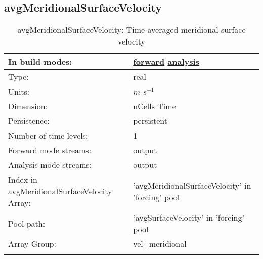 \subsection[avgMeridionalSurfaceVelocity]{avgMeridionalSurfaceVelocity}
\label{subsec:var_sec_forcing_avgMeridionalSurfaceVelocity}
\begin{center}
\begin{longtable}{| p{2.0in} | p{4.0in} |}
        \hline 
        In build modes: & \hyperref[subsec:forward_var_tab_forcing]{forward} \hyperref[subsec:analysis_var_tab_forcing]{analysis} \\
        \hline 
        Type: & real \\
        \hline 
        Units: & $m$ $s^{-1}$ \\
        \hline 
        Dimension: & nCells Time \\
        \hline 
        Persistence: & persistent \\
        \hline 
        Number of time levels: & 1 \\
        \hline 
		 Forward mode streams: &  output \\
        \hline 
		 Analysis mode streams: &  output \\
        \hline 
		 Index in avgMeridionalSurfaceVelocity Array: & 'avgMeridionalSurfaceVelocity' in 'forcing' pool \\
		 \hline 
            Pool path: & 'avgSurfaceVelocity' in 'forcing' pool
 \\
		 \hline 
		 Array Group: & vel\_meridional \\
		 \hline 
    \caption{avgMeridionalSurfaceVelocity: Time averaged meridional surface velocity}
\end{longtable}
\end{center}
